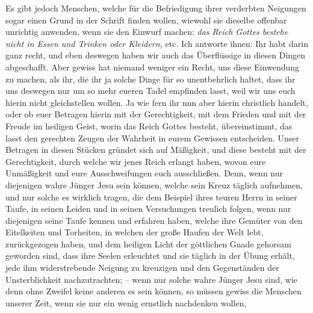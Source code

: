  Es gibt jedoch Menschen, welche für die
Befriedigung ihrer verderbten Neigungen
sogar einen Grund in der Schrift finden wollen, wiewohl sie dieselbe offenbar
unrichtig anwenden, wenn sie den Einwurf machen:
\textit{das Reich Gottes bestehe nicht
in Essen und Trinken oder Kleidern,} etc. Ich antworte ihnen: Ihr habt darin
ganz
recht, und eben deswegen haben wir auch das Überflüssige in diesen Dingen
abgeschafft. Aber gewiss hat niemand weniger ein Recht, uns diese Einwendung zu
machen, als ihr, die ihr ja solche Dinge für so unentbehrlich haltet, dass ihr
uns deswegen nur um so mehr eueren Tadel empfinden lasst, weil wir uns euch
hierin nicht gleichstellen wollen. Ja wie fern ihr nun aber hierin christlich
handelt, oder ob euer Betragen hierin mit der Gerechtigkeit, mit dem Frieden und
mit der Freude im heiligen Geist, worin das
Reich Gottes besteht,
übereinstimmt, das lasst den gerechten Zeugen der Wahrheit in
eurem Gewissen
entscheiden. Unser Betragen in diesen Stücken gründet sich auf Mäßigkeit, und
diese besteht mit der Gerechtigkeit, durch welche wir jenes Reich
erlangt
haben, wovon eure Unmäßigkeit und eure Ausschweifungen euch ausschließen. Denn,
wenn nur diejenigen wahre Jünger Jesu sein können, welche sein
Kreuz täglich
aufnehmen, und nur solche es wirklich tragen, die dem Beispiel ihres teuren
Herrn in seiner Taufe, in seinen Leiden und in seinen Versuchungen
treulich
folgen, wenn nur diejenigen seine Taufe kennen und erfahren haben, welche ihre
Gemüter von den Eitelkeiten und Torheiten, in welchen der große Haufen der Welt
lebt, zurückgezogen haben, und dem heiligen Licht der göttlichen
Gnade gehorsam
geworden sind, dass ihre Seelen erleuchtet und sie täglich in der Übung erhält,
jede ihm widerstrebende Neigung zu kreuzigen und den
Gegenständen der
Unsterblichkeit nachzutrachten;
-- wenn nur solche wahre Jünger
Jesu sind, wie denn ohne Zweifel keine anderen es sein können, so müssen gewiss
die Menschen unserer Zeit, wenn sie nur ein wenig ernstlich nachdenken wollen,
